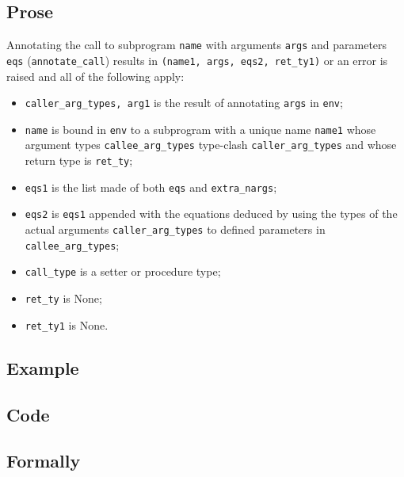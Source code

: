 \documentclass{book}
\begin{document}
  \subsection{Prose}
  Annotating the call to subprogram \texttt{name} with arguments \texttt{args}
  and parameters \texttt{eqs} (\texttt{annotate\_call}) results in
  \texttt{(name1, args, eqs2, ret\_ty1)} or an error is raised and all of the
  following apply:
  \begin{itemize}
    \item \texttt{caller\_arg\_types, arg1} is the result of annotating
      \texttt{args} in \texttt{env};
    \item \texttt{name} is bound in \texttt{env} to a subprogram with a unique
      name \texttt{name1} whose argument types \texttt{callee\_arg\_types}
      type-clash \texttt{caller\_arg\_types} and whose return type is
      \texttt{ret\_ty};
    \item \texttt{eqs1} is the list made of both \texttt{eqs} and
      \texttt{extra\_nargs};
    \item \texttt{eqs2} is \texttt{eqs1} appended with the equations deduced by
      using the types of the actual arguments \texttt{caller\_arg\_types} to
      defined parameters in \texttt{callee\_arg\_types};
    \item \texttt{call\_type} is a setter or procedure type;
    \item \texttt{ret\_ty} is None;
    \item \texttt{ret\_ty1} is None.
  \end{itemize}

  \subsection{Example}

  \subsection{Code}

\begin{emptyformal}
    \subsection{Formally}
\end{emptyformal}

\end{document}
